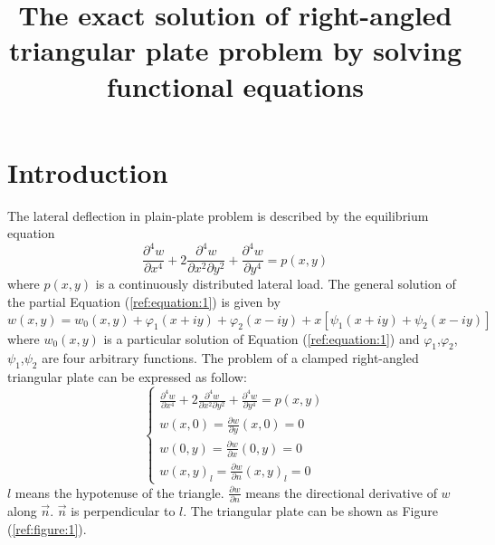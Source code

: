 \documentclass[a4paper]{article}      %
\title{The exact solution of right-angled triangular plate problem by solving functional equations}%
\begin{document}
\maketitle
\graphicspath{{Figures/}}
\section{Introduction}
The lateral deflection in plain-plate problem is described by the equilibrium equation
    \begin{equation}\label{ref:equation:1}                                       %
    \frac{\partial^{4}w}{\partial x^{4}}+ 2\frac{\partial^{4}w}{\partial x^{2} \partial y^{2}}+\frac{\partial^{4}w}{\partial y^{4}}=p(x,y)
    \end{equation}
where $ p(x,y)$ is a continuously distributed lateral load.
The general solution of the partial Equation (\ref{ref:equation:1}) is given by
    \begin{equation}\label{ref:equation:2}                                       %
    w(x,y)=w_{0}(x,y)+\varphi_{1}(x+iy)+\varphi_{2}(x-iy)+x[\psi_{1}(x+iy)+\psi_{2}(x-iy)]
    \end{equation}
where $w_{0}(x,y)$ is a particular solution of Equation (\ref{ref:equation:1}) and $\varphi_{1}$,$\varphi_{2}$,$\psi_{1}$,$\psi_{2}$ are four arbitrary functions.
The problem of a clamped right-angled triangular plate can be expressed as follow:
\begin{equation}\label{ref:equation:3}                                       %
     \left\{ {\begin{array}{*{20}{c}}
    {\frac{\displaystyle {{\partial ^4}w}}{\displaystyle {\partial {x^4}}} + 2\frac{\displaystyle {{\partial ^4}w}}{\displaystyle {\partial {x^2}\partial {y^2}}} + \frac{\displaystyle {{\partial ^4}w}}{\displaystyle {\partial {y^4}}} = p(x,y)}\\
    {w(x,0)=\frac{\displaystyle {\partial w}}{\displaystyle {\partial y}}(x,0)=0}\\
    {w(0,y)=\frac{\displaystyle {\partial w}}{\displaystyle {\partial x}}(0,y)=0}\\
    {w(x,y)_{l}=\frac{\displaystyle {\partial w}}{\displaystyle {\partial n}}(x,y)_{l}=0}
    \end{array}} \right.
    \end{equation}
$l$ means the hypotenuse of the triangle. $\frac{{\partial w}}{{\partial n}}$ means the directional derivative of $w$ along $\vec{n}$. $\vec{n}$ is perpendicular to $l$. The triangular plate can be shown as Figure (\ref{ref:figure:1}).
\end{document}
